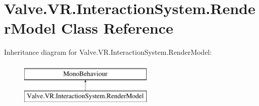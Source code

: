 \hypertarget{class_valve_1_1_v_r_1_1_interaction_system_1_1_render_model}{}\section{Valve.\+V\+R.\+Interaction\+System.\+Render\+Model Class Reference}
\label{class_valve_1_1_v_r_1_1_interaction_system_1_1_render_model}
Inheritance diagram for Valve.\+V\+R.\+Interaction\+System.\+Render\+Model\+:\begin{figure}[H]
\begin{center}
\leavevmode
\includegraphics[height=2.000000cm]{class_valve_1_1_v_r_1_1_interaction_system_1_1_render_model}
\end{center}
\end{figure}
